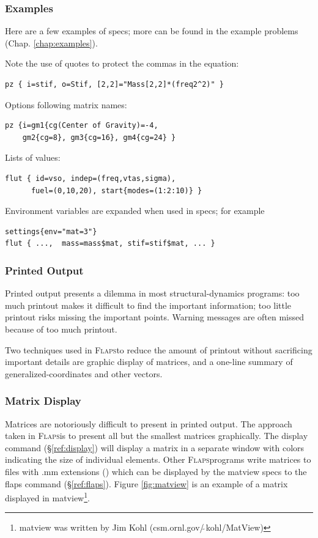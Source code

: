 \documentclass[11pt,openany,twoside]{book}
\numberwithin{equation}{section}		%
\newcommand{\Cmd}[1]{{\sf #1}}
\newcommand{\Flaps}{\textsc{Flaps\:}}
\newcommand{\Sectref}[1]{\S\ref{#1}}
\newcommand{\Chapref}[1]{Chap. \ref{#1}}
\begin{document}
\subsubsection{Examples}
Here are a few examples of specs; more can be found in the
example problems (\Chapref{chap:examples}).
\par
Note the use of quotes to protect the commas in the equation:
\begin{lstlisting}
pz { i=stif, o=Stif, [2,2]="Mass[2,2]*(freq2^2)" }
\end{lstlisting}
\par
Options following matrix names:
\begin{lstlisting}
pz {i=gm1{cg(Center of Gravity)=-4,
    gm2{cg=8}, gm3{cg=16}, gm4{cg=24} }
\end{lstlisting}
\par
Lists of values:
\begin{lstlisting}
flut { id=vso, indep=(freq,vtas,sigma),
      fuel=(0,10,20), start{modes=(1:2:10)} }
\end{lstlisting}
\par
Environment variables are expanded when used in specs; for example
\begin{lstlisting}
settings{env="mat=3"}
flut { ...,  mass=mass$mat, stif=stif$mat, ... }
\end{lstlisting}

\subsubsection{Printed Output}
Printed output presents a dilemma in most structural-dynamics
programs: too much printout makes it difficult to find
the important information; too little printout risks
missing the important points. Warning messages are
often missed because of too much printout.
\par
Two techniques used in \Flaps to reduce the amount of
printout without sacrificing important details are graphic
display of matrices, and a one-line summary of generalized-coordinates
and other vectors.

\subsubsection{Matrix Display}\label{ref:matrix-display}
Matrices are notoriously difficult to present in printed
output. The approach taken in \Flaps is to present all
but the smallest matrices graphically. The \Cmd{display}
command (\Sectref{ref:display})
will display a matrix in a separate window with colors indicating
the size of individual elements. Other \Flaps programs write
matrices to files with .mm extensions (\cite{matrixmarket})
which can be displayed by the \Cmd{matview}
specs to the \Cmd{flaps} command (\Sectref{ref:flaps}).
Figure \ref{fig:matview} is an example of a matrix
displayed in \Cmd{matview}\footnote{\Cmd{matview} was written by Jim Kohl (csm.ornl.gov/$\tilde{\ }$kohl/MatView)}.
\end{document}
